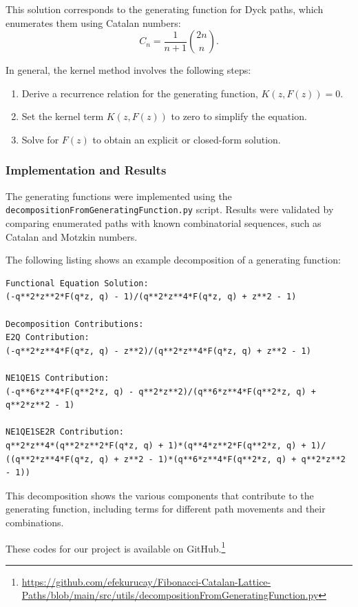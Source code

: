 \documentclass{article}
\begin{document}
This solution corresponds to the generating function for Dyck paths, which enumerates them using Catalan numbers:
\[
C_n = \frac{1}{n+1} \binom{2n}{n}.
\]

In general, the kernel method involves the following steps:
\begin{enumerate}
    \item Derive a recurrence relation for the generating function, $K(z, F(z)) = 0$.
    \item Set the kernel term $K(z, F(z))$ to zero to simplify the equation.
    \item Solve for $F(z)$ to obtain an explicit or closed-form solution.
\end{enumerate}


\subsubsection{Implementation and Results}
The generating functions were implemented using the \texttt{decompositionFromGeneratingFunction.py} script. Results were validated by comparing enumerated paths with known combinatorial sequences, such as Catalan and Motzkin numbers.

The following listing shows an example decomposition of a generating function:

\begin{lstlisting}[caption={Generating function decomposition for Dyck and Motzkin paths}]
Functional Equation Solution:
(-q**2*z**2*F(q*z, q) - 1)/(q**2*z**4*F(q*z, q) + z**2 - 1)

Decomposition Contributions:
E2Q Contribution: 
(-q**2*z**4*F(q*z, q) - z**2)/(q**2*z**4*F(q*z, q) + z**2 - 1)

NE1QE1S Contribution: 
(-q**6*z**4*F(q**2*z, q) - q**2*z**2)/(q**6*z**4*F(q**2*z, q) + q**2*z**2 - 1)

NE1QE1SE2R Contribution:
q**2*z**4*(q**2*z**2*F(q*z, q) + 1)*(q**4*z**2*F(q**2*z, q) + 1)/
((q**2*z**4*F(q*z, q) + z**2 - 1)*(q**6*z**4*F(q**2*z, q) + q**2*z**2 - 1))
\end{lstlisting}

This decomposition shows the various components that contribute to the generating function, including terms for different path movements and their combinations.

These codes for our project is available on GitHub.\footnote{\url{https://github.com/efekurucay/Fibonacci-Catalan-Lattice-Paths/blob/main/src/utils/decompositionFromGeneratingFunction.py}}
\end{document}

